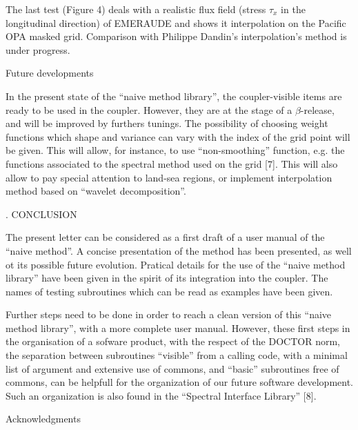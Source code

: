 The last test  (Figure 4) deals with a realistic flux field (stress $\tau_ x$
in the longitudinal direction) of EMERAUDE and shows it interpolation on
the Pacific OPA masked grid. Comparison with Philippe Dandin's
interpolation's method is under progress.                        



 Future developments

In the  present state of the ``naive method library'',
 the coupler-visible items  are
ready  to be used in the coupler. However, they are at the
stage of a $\beta$-release, and will be improved by furthers tunings.  The
possibility of choosing weight functions which shape and variance can vary
with the index of the grid point will be given. This will allow, for instance, 
to use ``non-smoothing'' function, e.g. the  functions associated to the
spectral method used on the grid [7]. This will also allow   to pay special
attention to land-sea regions, or  implement interpolation method based on
``wavelet decomposition''.  






. CONCLUSION 

The present letter can be considered as a first draft of a user manual of
the ``naive method''. A concise presentation
 of the  method has been presented, 
as well ot its possible future evolution. Pratical details for the
use of the ``naive method library'' have been given in the spirit of its
integration into the coupler. The names of testing subroutines which can be 
read as examples have been given. 



Further steps need to be done in order to reach a clean version of this
``naive method library'', with a more complete user manual. However, these
first steps in the organisation of a sofware product, with the respect of
the DOCTOR norm, the separation between  subroutines ``visible''  from a
calling code, with a minimal list of argument and extensive use of
commons, and  ``basic'' subroutines free of commons, can be helpfull  for
the organization of our future software development. Such an organization
is also found in the ``Spectral Interface Library'' [8]. 



\beginsection  Acknowledgments 

